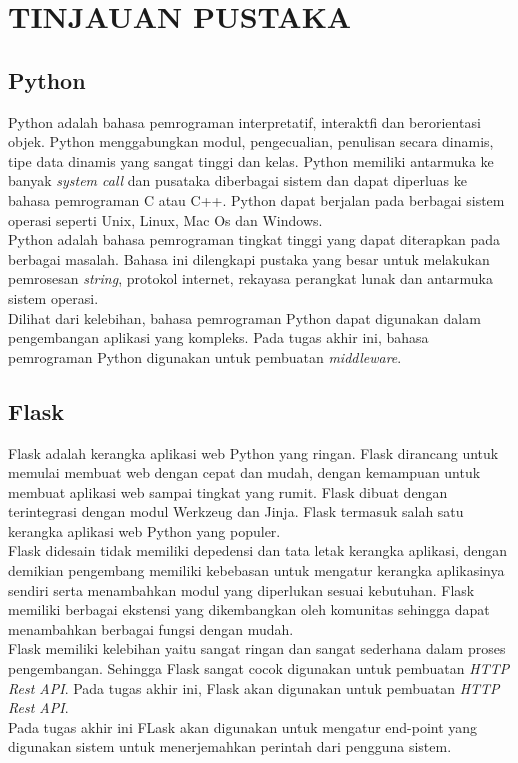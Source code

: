 \chapter{TINJAUAN PUSTAKA}
		\section{Python}
        		Python adalah bahasa pemrograman interpretatif, interaktfi dan berorientasi objek. Python menggabungkan modul, pengecualian, penulisan secara dinamis, tipe data dinamis yang sangat tinggi dan kelas. Python memiliki antarmuka ke banyak \textit{system call} dan pusataka diberbagai sistem dan dapat diperluas ke bahasa pemrograman C atau C++. Python dapat berjalan pada berbagai sistem operasi seperti Unix, Linux, Mac Os dan Windows.\\
                \indent Python adalah bahasa pemrograman tingkat tinggi yang dapat diterapkan pada berbagai masalah. Bahasa ini dilengkapi pustaka yang besar untuk melakukan pemrosesan \textit{string}, protokol internet, rekayasa perangkat lunak dan antarmuka sistem operasi\cite{python_faq}.\\
                \indent Dilihat dari kelebihan, bahasa pemrograman Python dapat digunakan dalam pengembangan aplikasi yang kompleks. Pada tugas akhir ini, bahasa pemrograman Python digunakan untuk pembuatan \textit{middleware}.
        \section{Flask}
         	Flask adalah kerangka aplikasi web Python yang ringan. Flask dirancang untuk memulai membuat web dengan cepat dan mudah, dengan kemampuan untuk membuat aplikasi web sampai tingkat yang rumit. Flask dibuat dengan terintegrasi dengan modul Werkzeug dan Jinja. Flask termasuk salah satu kerangka aplikasi web Python yang populer.\\
            \indent Flask didesain tidak memiliki depedensi dan tata letak kerangka aplikasi, dengan demikian pengembang memiliki kebebasan untuk mengatur kerangka aplikasinya sendiri serta menambahkan modul yang diperlukan sesuai kebutuhan. Flask memiliki berbagai ekstensi yang dikembangkan oleh komunitas sehingga dapat menambahkan berbagai fungsi dengan mudah\cite{about_flask}. \\
            \indent Flask memiliki kelebihan yaitu sangat ringan dan sangat sederhana dalam proses pengembangan. Sehingga Flask sangat cocok digunakan untuk pembuatan \textit{HTTP Rest API}. Pada tugas akhir ini, Flask akan digunakan untuk pembuatan \textit{HTTP Rest API}. \\
            \indent Pada tugas akhir ini FLask akan digunakan untuk mengatur end-point yang digunakan sistem untuk menerjemahkan perintah dari pengguna sistem.
        
